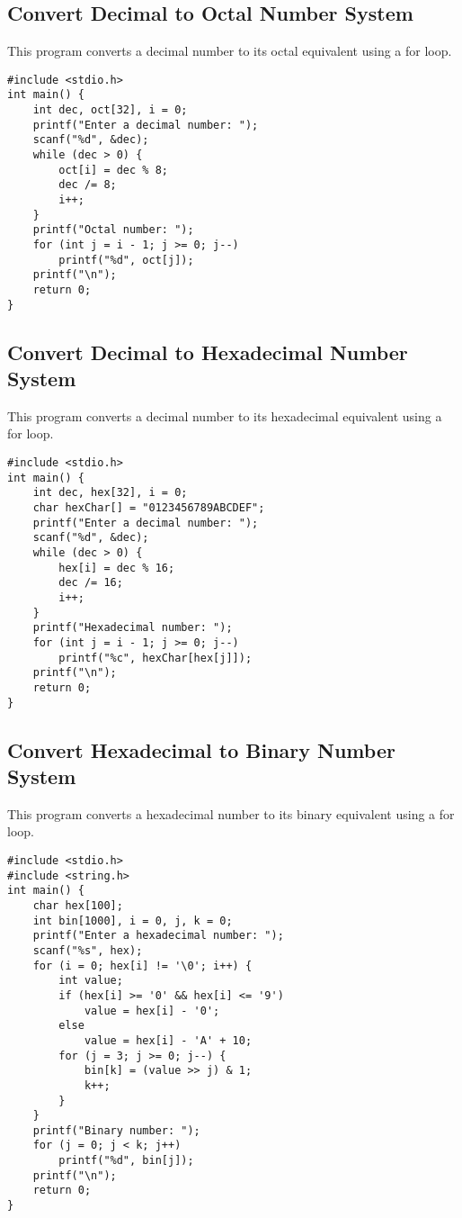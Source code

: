 \documentclass[a4paper,12pt]{article}
\begin{document}
\newpage

\subsection{Convert Decimal to Octal Number System}
This program converts a decimal number to its octal equivalent using a for loop.

\begin{lstlisting}[caption={Convert Decimal to Octal Number System}]
#include <stdio.h>
int main() {
    int dec, oct[32], i = 0;
    printf("Enter a decimal number: ");
    scanf("%d", &dec);
    while (dec > 0) {
        oct[i] = dec % 8;
        dec /= 8;
        i++;
    }
    printf("Octal number: ");
    for (int j = i - 1; j >= 0; j--)
        printf("%d", oct[j]);
    printf("\n");
    return 0;
}
\end{lstlisting}

\newpage

\subsection{Convert Decimal to Hexadecimal Number System}
This program converts a decimal number to its hexadecimal equivalent using a for loop.

\begin{lstlisting}[caption={Convert Decimal to Hexadecimal Number System}]
#include <stdio.h>
int main() {
    int dec, hex[32], i = 0;
    char hexChar[] = "0123456789ABCDEF";
    printf("Enter a decimal number: ");
    scanf("%d", &dec);
    while (dec > 0) {
        hex[i] = dec % 16;
        dec /= 16;
        i++;
    }
    printf("Hexadecimal number: ");
    for (int j = i - 1; j >= 0; j--)
        printf("%c", hexChar[hex[j]]);
    printf("\n");
    return 0;
}
\end{lstlisting}

\newpage

\subsection{Convert Hexadecimal to Binary Number System}
This program converts a hexadecimal number to its binary equivalent using a for loop.

\begin{lstlisting}[caption={Convert Hexadecimal to Binary Number System}]
#include <stdio.h>
#include <string.h>
int main() {
    char hex[100];
    int bin[1000], i = 0, j, k = 0;
    printf("Enter a hexadecimal number: ");
    scanf("%s", hex);
    for (i = 0; hex[i] != '\0'; i++) {
        int value;
        if (hex[i] >= '0' && hex[i] <= '9')
            value = hex[i] - '0';
        else
            value = hex[i] - 'A' + 10;
        for (j = 3; j >= 0; j--) {
            bin[k] = (value >> j) & 1;
            k++;
        }
    }
    printf("Binary number: ");
    for (j = 0; j < k; j++)
        printf("%d", bin[j]);
    printf("\n");
    return 0;
}
\end{lstlisting}
\end{document}
